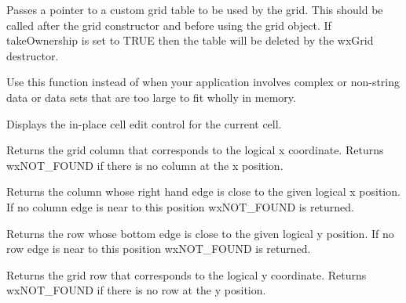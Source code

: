 
\label{wxgridsettable}


Passes a pointer to a custom grid table to be used by the grid.  This should be called
after the grid constructor and before using the grid object. If takeOwnership is set to
TRUE then the table will be deleted by the wxGrid destructor. 

Use this function instead of  when your
application involves complex or non-string data or data sets that are too large to fit
wholly in memory. 

\label{wxgridshowcelleditcontrol}


Displays the in-place cell edit control for the current cell.

\label{wxgridxtocol}


Returns the grid column that corresponds to the logical x coordinate. Returns
wxNOT_FOUND if there is no column at the x position.

\label{wxgridxtoedgeofcol}


Returns the column whose right hand edge is close to the given logical x position.
If no column edge is near to this position wxNOT_FOUND is returned.

\label{wxgridytoedgeofrow}


Returns the row whose bottom edge is close to the given logical y position.
If no row edge is near to this position wxNOT_FOUND is returned.

\label{wxgridytorow}


Returns the grid row that corresponds to the logical y coordinate. Returns
wxNOT_FOUND if there is no row at the y position.



